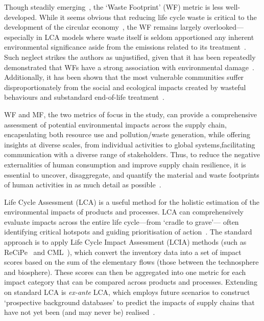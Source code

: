 \documentclass[a4paper,fleqn]{cas-dc}
\begin{document}
Though steadily emerging~\citep{laurenti2016wastefootprint,demirer2019wastefootprint,guillotreau2023wastefootprint}, the `Waste Footprint' (WF) metric is less well-developed. While it seems obvious that reducing life cycle waste is critical to the development of the circular economy~\citep{towa2020wastefootprint,ellenmacarthur2015ce}, the WF remains largely overlooked---especially in LCA models where waste itself is seldom apportioned any inherent environmental significance aside from the emissions related to its treatment~\citep{laurenti2023wastefootprint}. Such neglect strikes the authors as unjustified, given that it has been repeatedly demonstrated that WFs have a strong association with environmental damage~\citep{laurenti2023wastefootprint,doka2024publications, ridoutt2010wasteimpacts,jaio2013wasteabsorbtionfootprint}. Additionally, it has been shown that the most vulnerable communities suffer disproportionately from the social and ecological impacts created by wasteful behaviours and substandard end-of-life treatment~\citep{pellow2023envjusticewaste,akese2018envjustice}.

WF and MF, the two metrics of focus in the study, can provide a comprehensive assessment of potential environmental impacts across the supply chain, encapsulating both resource use and pollution/waste generation, while offering insights at diverse scales, from individual activities to global systems,facilitating communication with a diverse range of stakeholders. Thus, to reduce the negative externalities of human consumption and improve supply chain resilience, it is essential to uncover, disaggregate, and quantify the material and waste footprints of human activities in as much detail as possible~\citep{bisinella2024wastelca,towa2020wastefootprint,berger2020mineralsinlca,sonderegger2020mineralsinlca}.

Life Cycle Assessment (LCA) is a useful method for the holistic estimation of the environmental impacts of products and processes. LCA can comprehensively evaluate impacts across the entire life cycle---from `cradle to grave'--- often identifying critical hotspots and guiding prioritisation of action~\citep{guinee2011lca}. The standard approach is to apply Life Cycle Impact Assessment (LCIA) methods (such as ReCiPe~\citep{huijbregts2016recipe} and CML~\citep{guinee2002cml}), which convert the inventory data into a set of impact scores based on the sum of the elementary flows (those between the technosphere and biosphere). These scores can then be aggregated into one metric for each impact category that can be compared across products and processes. Extending on standard LCA is \textit{ex-ante} LCA, which employs future scenarios to construct `prospective background databases' to predict the impacts of supply chains that have not yet been (and may never be) realised~\citep{cucurachi2018exante,blanco2020exante}.
\end{document}
